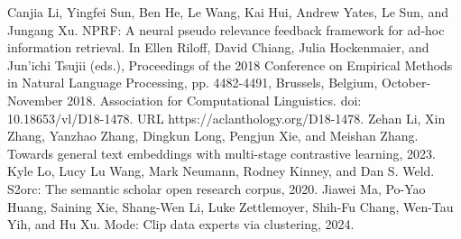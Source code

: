 Canjia Li, Yingfei Sun, Ben He, Le Wang, Kai Hui, Andrew Yates, Le Sun, and Jungang Xu. NPRF: A neural pseudo relevance feedback framework for ad-hoc information retrieval. In Ellen Riloff, David Chiang, Julia Hockenmaier, and Jun'ichi Tsujii (eds.), Proceedings of the 2018 Conference on Empirical Methods in Natural Language Processing, pp. 4482-4491, Brussels, Belgium, October-November 2018. Association for Computational Linguistics. doi: 10.18653/vl/D18-1478. URL https://aclanthology.org/D18-1478.
Zehan Li, Xin Zhang, Yanzhao Zhang, Dingkun Long, Pengjun Xie, and Meishan Zhang. Towards general text embeddings with multi-stage contrastive learning, 2023.
Kyle Lo, Lucy Lu Wang, Mark Neumann, Rodney Kinney, and Dan S. Weld. S2orc: The semantic scholar open research corpus, 2020.
Jiawei Ma, Po-Yao Huang, Saining Xie, Shang-Wen Li, Luke Zettlemoyer, Shih-Fu Chang, Wen-Tau Yih, and Hu Xu. Mode: Clip data experts via clustering, 2024.


